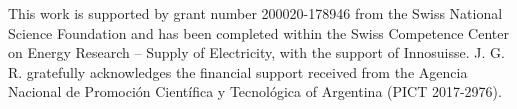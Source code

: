 \documentclass[draft]{agujournal2019}
\begin{document}
%
%
%
%
%
%
%
%

\acknowledgments
This work is supported by grant number 200020-178946 from the Swiss National Science Foundation and has been completed within the Swiss Competence Center on Energy Research – Supply of Electricity, with the support of Innosuisse. J. G. R. gratefully acknowledges the financial support received from the Agencia Nacional de Promoción Científica y Tecnológica of Argentina (PICT 2017-2976).

%
%







%
%
%
%
%
\end{document}
